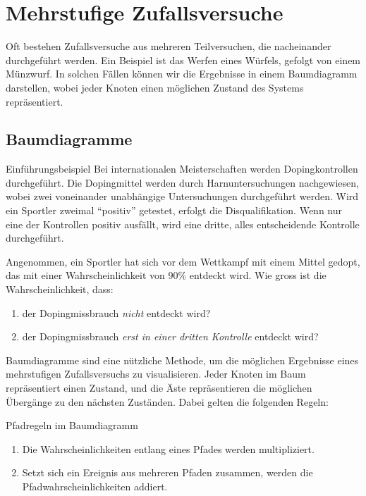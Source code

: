 \section{Mehrstufige Zufallsversuche}
Oft bestehen Zufallsversuche aus mehreren Teilversuchen, die nacheinander durchgeführt werden. Ein Beispiel ist das Werfen eines Würfels, gefolgt von einem Münzwurf. In solchen Fällen können wir die Ergebnisse in einem Baumdiagramm darstellen, wobei jeder Knoten einen möglichen Zustand des Systems repräsentiert.
\subsection{Baumdiagramme}
\begin{bsp}
  {Einführungsbeispiel}{}
  Bei internationalen Meisterschaften werden Dopingkontrollen durchgeführt. Die Dopingmittel werden durch Harnuntersuchungen nachgewiesen, wobei zwei voneinander unabhängige Untersuchungen durchgeführt werden. Wird ein Sportler zweimal ``positiv'' getestet, erfolgt die Disqualifikation. Wenn nur eine der Kontrollen positiv ausfällt, wird eine dritte, alles entscheidende Kontrolle durchgeführt.

  Angenommen, ein Sportler hat sich vor dem Wettkampf mit einem Mittel gedopt, das mit einer Wahrscheinlichkeit von \(90\%\) entdeckt wird. Wie gross ist die Wahrscheinlichkeit, dass:

  \begin{enumerate}
    \item der Dopingmissbrauch \emph{nicht} entdeckt wird?
    \item der Dopingmissbrauch \emph{erst in einer dritten Kontrolle} entdeckt wird?
  \end{enumerate}

  \vspace*{10 cm}
\end{bsp}
\clearpage
Baumdiagramme sind eine nützliche Methode, um die möglichen Ergebnisse eines mehrstufigen Zufallsversuchs zu visualisieren. Jeder Knoten im Baum repräsentiert einen Zustand, und die Äste repräsentieren die möglichen Übergänge zu den nächsten Zuständen. Dabei gelten die folgenden Regeln:
\begin{satz}
  {Pfadregeln im Baumdiagramm}{}
  \begin{enumerate}
    \item Die Wahrscheinlichkeiten entlang eines Pfades werden multipliziert.
    \item Setzt sich ein Ereignis aus mehreren Pfaden zusammen, werden die Pfadwahrscheinlichkeiten addiert.
  \end{enumerate}
\end{satz}

